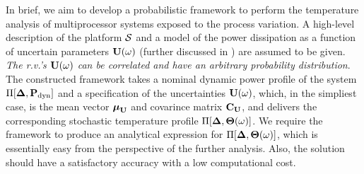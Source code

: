 In brief, we aim to develop a probabilistic framework to perform the temperature analysis of multiprocessor systems exposed to the process variation. A high-level description of the platform $\mathcal{S}$ and a model of the power dissipation as a function of uncertain parameters $\vU(\o)$ (further discussed in ) are assumed to be given. \emph{The r.v.'s $\vU(\o)$ can be correlated and have an arbitrary probability distribution}. The constructed framework takes a nominal dynamic power profile of the system $\prof{\mP_\dyn}$ and a specification of the uncertainties $\vU(\o)$, which, in the simpliest case, is the mean vector $\vExp_\mrv{\vU}$ and covarince matrix $\mCov_\mrv{\vU}$, and delivers the corresponding stochastic temperature profile $\Pi[\boldsymbol{\Delta}, {\boldsymbol\Theta}(\omega)]$. We require the framework to produce an analytical expression for $\Pi[\boldsymbol{\Delta}, {\boldsymbol\Theta}(\omega)]$, which is essentially easy from the perspective of the further analysis. Also, the solution should have a satisfactory accuracy with a low computational cost.
